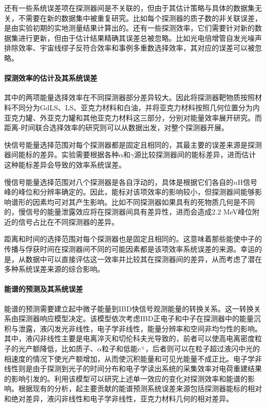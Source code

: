 \documentclass[a4paper,zihao=-4]{article}
\begin{document}
还有一些系统误差项在探测器间是不关联的，但由于其估计策略与具体的数据集无关，不需要在新的数据集中被重复研究。比如每个探测器的质子数的非关联误差，是由实验初期的实地测量结果计算出的。还有一些探测效率，它们需要针对新的数据集进行更新，但由于估计结果精确其误差总被忽略。比如光电倍增管自发光噪声排除效率、宇宙线缪子反符合效率和事例多重数选择效率，其对应的误差可以被忽略。

\paragraph{探测效率的估计及其系统误差}

其中的两项能量选择效率在不同探测器部分差异较大。因此将探测器靶物质按照材料不同分为GdLS、LS、亚克力材料和白油，并将亚克力材料按照几何位置分为内亚克力罐、外亚克力罐和其他亚克力材料这三部分，分别对能量效率展开研究。而距离-时间联合选择效率的研究则可以从数据出发，对整个探测器开展。

快信号能量选择范围对每个探测器都是固定且相同的，其最主要的误差来源是探测器间能标的差异。实验需要根据各种$\alpha$和$\gamma$源比较探测器间的能标差异，进而估计这种能标差异会导致的效率系统误差。

慢信号能量选择范围对八个探测器是各自浮动的，具体是根据它们各自的$n$H信号峰的峰位和分辨率确定的。因此，能标对该项效率的影响较小，但探测器间能够影响谱形的因素均可对其产生影响。比如不同探测器如果具有的死物质几何是不同的，慢信号的能量泄露效应将在探测器间具有差异性，进而会造成2.2 MeV峰位附近的信号占比在不同探测器的差异。

距离和时间的选择范围对每个探测器也是固定且相同的。这意味着那些能使中子的传播与俘获时间在探测器间不同的可能因素都是该项效率系统误差的来源。幸运的是，从数据中可以直接评估这一效率并比较其在探测器间的差异，从而考虑了潜在多种系统误差来源的综合影响。

\paragraph{能谱的预测及其系统误差}
能谱的预测需要建立起中微子能量到IBD快信号观测能量的转换关系。这一转换关系由探测器响应模型决定。该模型依次考虑IBD正电子和中子在探测器中的能量沉积与泄露，液闪发光非线性，电子学非线性，能量分辨率和空间非均匀性的影响。其中，液闪非线性主要是电离淬灭和切伦科夫光导致的，前者可以使高电离密度粒子的光产额降低，比如质子、$\alpha$粒子和低能$e^\pm$，后者则可以在粒子超过液闪中光的相速度的情况下使光产额增加，从而使沉积能量和可见光能量不成正比。电子学非线性则是由于探测到光子的时间分布和电子学读出系统的采集效率对电荷重建结果的影响引发的。利用该模型可以研究上述单一效应的变化对探测效率和能谱的影响。根据现有的分析，起主要贡献的能谱预测系统误差来源包括探测器能标的相对和绝对差异，液闪非线性和电子学非线性，亚克力材料几何的相对差异。
\end{document}
